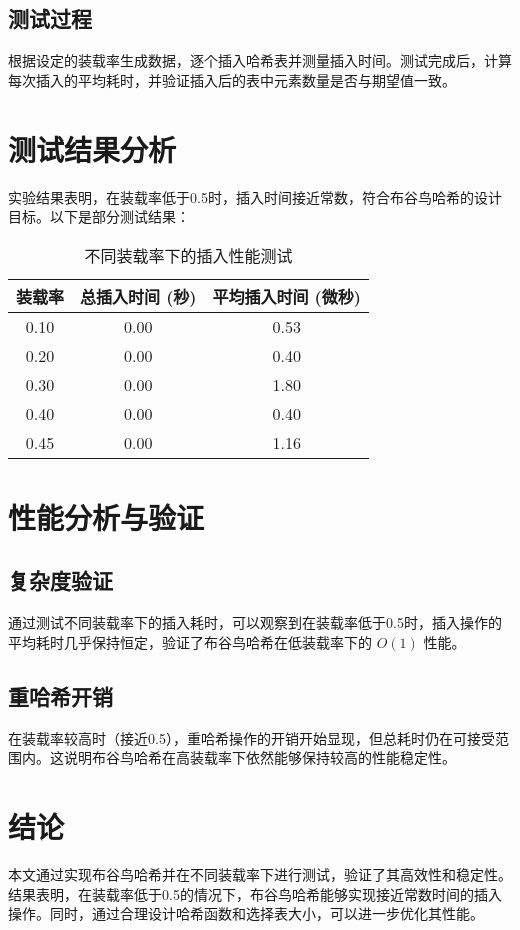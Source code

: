 \documentclass{article}
\begin{document}
    \subsection{测试过程}
    根据设定的装载率生成数据，逐个插入哈希表并测量插入时间。测试完成后，计算每次插入的平均耗时，并验证插入后的表中元素数量是否与期望值一致。

    \section{测试结果分析}
    实验结果表明，在装载率低于0.5时，插入时间接近常数，符合布谷鸟哈希的设计目标。以下是部分测试结果：

    \begin{table}[h!]
        \centering
        \begin{tabular}{|c|c|c|}
            \hline
            装载率 & 总插入时间 (秒) & 平均插入时间 (微秒) \\
            \hline
            0.10 & 0.00 & 0.53 \\
            0.20 & 0.00 & 0.40 \\
            0.30 & 0.00 & 1.80 \\
            0.40 & 0.00 & 0.40 \\
            0.45 & 0.00 & 1.16 \\
            \hline
        \end{tabular}
        \caption{不同装载率下的插入性能测试}
    \end{table}

    \section{性能分析与验证}
    \subsection{复杂度验证}
    通过测试不同装载率下的插入耗时，可以观察到在装载率低于0.5时，插入操作的平均耗时几乎保持恒定，验证了布谷鸟哈希在低装载率下的 $O(1)$ 性能。

    \subsection{重哈希开销}
    在装载率较高时（接近0.5），重哈希操作的开销开始显现，但总耗时仍在可接受范围内。这说明布谷鸟哈希在高装载率下依然能够保持较高的性能稳定性。

    \section{结论}
    本文通过实现布谷鸟哈希并在不同装载率下进行测试，验证了其高效性和稳定性。结果表明，在装载率低于0.5的情况下，布谷鸟哈希能够实现接近常数时间的插入操作。同时，通过合理设计哈希函数和选择表大小，可以进一步优化其性能。
\end{document}

